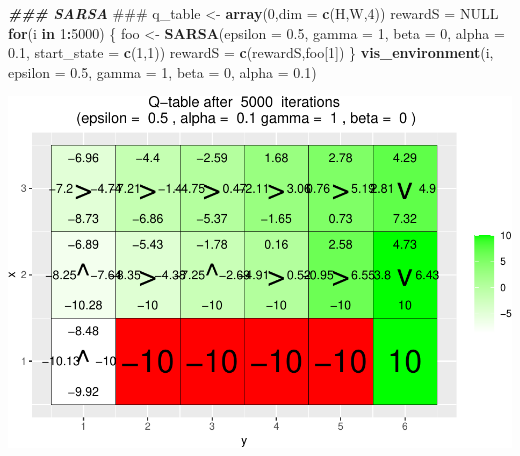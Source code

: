 \documentclass[
]{article}
\newenvironment{Shaded}{\begin{snugshade}}{\end{snugshade}}
\newcommand{\AlertTok}[1]{\textcolor[rgb]{0.94,0.16,0.16}{#1}}
\newcommand{\AttributeTok}[1]{\textcolor[rgb]{0.13,0.29,0.53}{#1}}
\newcommand{\ConstantTok}[1]{\textcolor[rgb]{0.56,0.35,0.01}{#1}}
\newcommand{\ControlFlowTok}[1]{\textcolor[rgb]{0.13,0.29,0.53}{\textbf{#1}}}
\newcommand{\DecValTok}[1]{\textcolor[rgb]{0.00,0.00,0.81}{#1}}
\newcommand{\DocumentationTok}[1]{\textcolor[rgb]{0.56,0.35,0.01}{\textbf{\textit{#1}}}}
\newcommand{\FloatTok}[1]{\textcolor[rgb]{0.00,0.00,0.81}{#1}}
\newcommand{\FunctionTok}[1]{\textcolor[rgb]{0.13,0.29,0.53}{\textbf{#1}}}
\newcommand{\NormalTok}[1]{#1}
\newcommand{\OtherTok}[1]{\textcolor[rgb]{0.56,0.35,0.01}{#1}}
\newcommand{\SpecialCharTok}[1]{\textcolor[rgb]{0.81,0.36,0.00}{\textbf{#1}}}
\begin{document}
\begin{Shaded}
\begin{Highlighting}[]
\DocumentationTok{\#\#\# SARSA }\AlertTok{\#\#\#}
\NormalTok{q\_table }\OtherTok{\textless{}{-}} \FunctionTok{array}\NormalTok{(}\DecValTok{0}\NormalTok{,}\AttributeTok{dim =} \FunctionTok{c}\NormalTok{(H,W,}\DecValTok{4}\NormalTok{))}
\NormalTok{rewardS }\OtherTok{=} \ConstantTok{NULL}
\ControlFlowTok{for}\NormalTok{(i }\ControlFlowTok{in} \DecValTok{1}\SpecialCharTok{:}\DecValTok{5000}\NormalTok{) \{}
\NormalTok{  foo }\OtherTok{\textless{}{-}} \FunctionTok{SARSA}\NormalTok{(}\AttributeTok{epsilon =} \FloatTok{0.5}\NormalTok{, }\AttributeTok{gamma =} \DecValTok{1}\NormalTok{, }\AttributeTok{beta =} \DecValTok{0}\NormalTok{, }\AttributeTok{alpha =} \FloatTok{0.1}\NormalTok{, }\AttributeTok{start\_state =} \FunctionTok{c}\NormalTok{(}\DecValTok{1}\NormalTok{,}\DecValTok{1}\NormalTok{))}
\NormalTok{  rewardS }\OtherTok{=} \FunctionTok{c}\NormalTok{(rewardS,foo[}\DecValTok{1}\NormalTok{])}
\NormalTok{\}}
\FunctionTok{vis\_environment}\NormalTok{(i, }\AttributeTok{epsilon =} \FloatTok{0.5}\NormalTok{, }\AttributeTok{gamma =} \DecValTok{1}\NormalTok{, }\AttributeTok{beta =} \DecValTok{0}\NormalTok{, }\AttributeTok{alpha =} \FloatTok{0.1}\NormalTok{)}
\end{Highlighting}
\end{Shaded}

\includegraphics{jan2021_files/figure-latex/unnamed-chunk-3-2.pdf}
\end{document}
